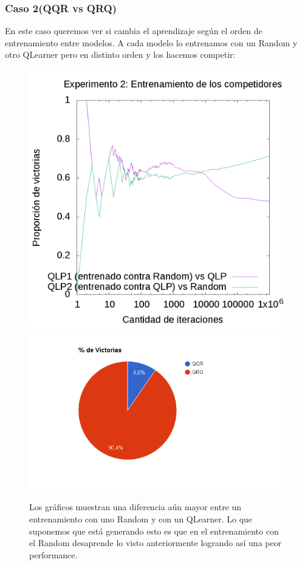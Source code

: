 \documentclass[10pt, a4paper]{article}
\begin{document}
\subsubsection{Caso 2(QQR vs QRQ)}


En este caso queremos ver si cambia el aprendizaje según el orden de entrenamiento entre modelos. A cada modelo lo entrenamos con un Random y otro QLearner pero en distinto orden y los hacemos competir:


\begin{figure}[H]
  \begin{minipage}[c]{1\textwidth}
  \includegraphics[scale=0.2]{E2train.png}
  \includegraphics[scale=0.45]{QQRvsQRQ.png}
  \caption {Los gráficos muestran una diferencia aún mayor entre un entrenamiento con uno Random y con un QLearner. Lo que suponemos que está generando esto es que en el entrenamiento con el Random desaprende lo visto anteriormente logrando así una peor performance.}
  \end{minipage}
\end{figure}
\end{document}
